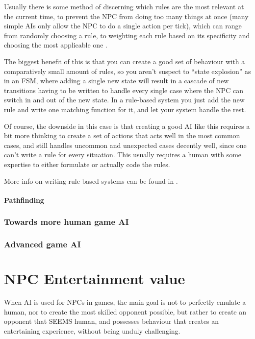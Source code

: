 \documentclass[]{report}
\begin{document}
Usually there is some method of discerning which rules are the most relevant at
the current time, to prevent the NPC from doing too many things at once (many
simple AIs only allow the NPC to do a single action per tick), which can range
from randomly choosing a rule, to weighting each rule based on its specificity
and choosing the most applicable one \citep{Freeman-Hargis}.

The biggest benefit of this is that you can create a good set of behaviour with
a comparatively small amount of rules, so you aren't suspect to ``state
explosion'' as in an FSM, where adding a single new state will result in a
cascade of new transitions having to be written to handle every single case
where the NPC can switch in and out of the new state. In a rule-based system you
just add the new rule and write one matching function for it, and let your
system handle the rest.

Of course, the downside in this case is that creating a good AI like this
requires a bit more thinking to create a set of actions that acts well in the
most common cases, and still handles uncommon and unexpected cases decently
well, since one can't write a rule for every situation. This usually requires a
human with some expertise to either formulate or actually code the rules.

More info on writing rule-based systems can be found in
\citet[chap.~4]{kirby2011introduction}.


\subsubsection{Pathfinding}
\label{sec:pathfinding}

\subsection{Towards more human game AI}
\label{sec:towards-more-human}

\subsection{Advanced game AI}
\label{sec:advanced-game-ai}


\chapter{NPC Entertainment value}
\label{cha:npc-entert-value}

When AI is used for NPCs in games, the main goal is not to perfectly emulate a
human, nor to create the most skilled opponent possible, but rather to create an
opponent that SEEMS human, and possesses behaviour that creates an entertaining
experience, without being unduly challenging.
\end{document}
